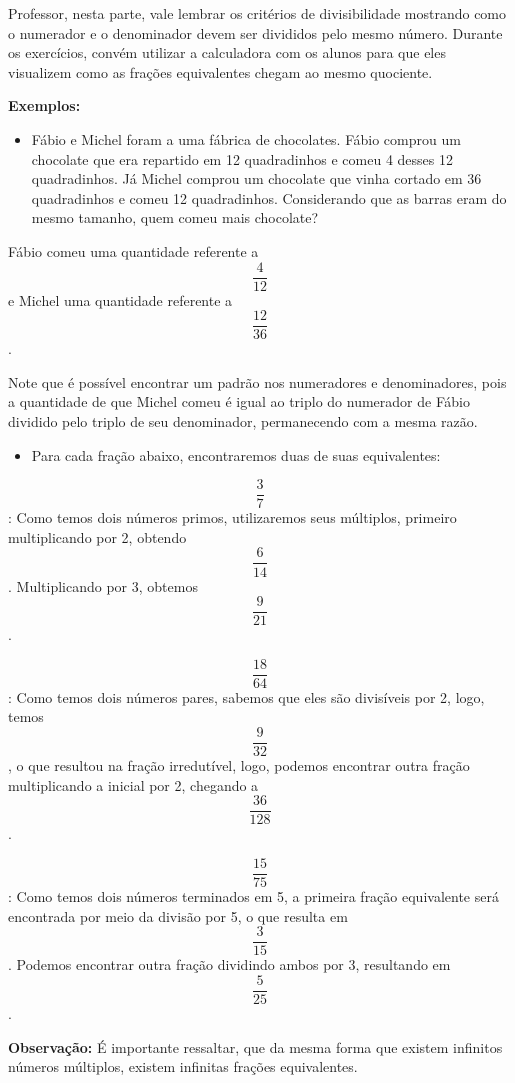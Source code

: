 Professor, nesta parte, vale lembrar os critérios de divisibilidade
mostrando como o numerador e o denominador devem ser divididos pelo
mesmo número. Durante os exercícios, convém utilizar a calculadora com
os alunos para que eles visualizem como as frações equivalentes chegam
ao mesmo quociente.

\textbf{Exemplos:}

\begin{itemize}
\tightlist
\item
  Fábio e Michel foram a uma fábrica de chocolates. Fábio comprou um
  chocolate que era repartido em 12 quadradinhos e comeu 4 desses 12
  quadradinhos. Já Michel comprou um chocolate que vinha cortado em 36
  quadradinhos e comeu 12 quadradinhos. Considerando que as barras eram
  do mesmo tamanho, quem comeu mais chocolate?
\end{itemize}

Fábio comeu uma quantidade referente a \[\frac{4}{12}\] e Michel uma
quantidade referente a \[\frac{12}{36}\] .

Note que é possível encontrar um padrão nos numeradores e denominadores,
pois a quantidade de que Michel comeu é igual ao triplo do numerador de
Fábio dividido pelo triplo de seu denominador, permanecendo com a mesma
razão.

\begin{itemize}
\tightlist
\item
  Para cada fração abaixo, encontraremos duas de suas equivalentes:
\end{itemize}

\[\frac{3}{7}\] : Como temos dois números primos, utilizaremos seus
múltiplos, primeiro multiplicando por 2, obtendo \[\frac{6}{14}\].
Multiplicando por 3, obtemos \[\frac{9}{21}\].

\[\frac{18}{64}\]: Como temos dois números pares, sabemos que eles são
divisíveis por 2, logo, temos \[\frac{9}{32}\], o que resultou na fração
irredutível, logo, podemos encontrar outra fração multiplicando a
inicial por 2, chegando a \[\frac{36}{128}\].

\[\frac{15}{75}\]: Como temos dois números terminados em 5, a primeira
fração equivalente será encontrada por meio da divisão por 5, o que
resulta em \[\frac{3}{15}\]. Podemos encontrar outra fração dividindo
ambos por 3, resultando em \[\frac{5}{25}\].

\textbf{Observação:} É importante ressaltar, que da mesma forma que
existem infinitos números múltiplos, existem infinitas frações
equivalentes.

